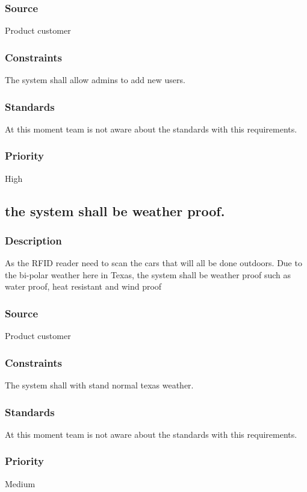 \subsubsection{Source}
Product customer
\subsubsection{Constraints}
The system shall allow admins to add new users.
\subsubsection{Standards}
At this moment team is not aware about the standards with this requirements.
\subsubsection{Priority}
High




\subsection{the system shall be weather proof.}
\subsubsection{Description}
As the RFID reader need to scan the cars that will all be done outdoors. Due to the bi-polar weather here in Texas, the system shall be weather proof such as water proof, heat resistant and wind proof
\subsubsection{Source}
Product customer
\subsubsection{Constraints}
The system shall with stand normal texas weather.
\subsubsection{Standards}
At this moment team is not aware about the standards with this requirements.
\subsubsection{Priority}
Medium






